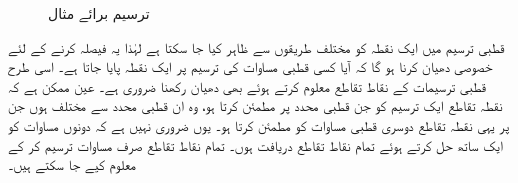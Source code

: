 \begin{figure}
\begin{subfigure}{0.30\textwidth}
\caption{}
\end{subfigure}
\caption{ترسیم برائے مثال }
\label{شکل_مثال_مخروط_کارتیسی_قطبی_ب}
\end{figure}



قطبی ترسیم میں ایک نقطہ کو مختلف طریقوں سے ظاہر کیا جا سکتا ہے لہٰذا یہ فیصلہ کرنے کے لئے خصوصی دھیان کرنا ہو گا کہ آیا کسی قطبی مساوات  کی ترسیم پر ایک  نقطہ پایا جاتا ہے۔ اسی طرح قطبی ترسیمات کے نقاط تقاطع معلوم کرتے ہوئے بھی دھیان رکھنا ضروری ہے۔  عین ممکن ہے کہ نقطہ تقاطع ایک ترسیم کو جن  قطبی محدد پر مطمئن کرتا ہو، وہ ان قطبی محدد سے مختلف ہوں جن پر یہی نقطہ تقاطع دوسری قطبی مساوات کو مطمئن کرتا ہو۔ یوں ضروری نہیں ہے کہ دونوں مساوات کو ایک ساتھ حل کرتے ہوئے تمام نقاط تقاطع دریافت ہوں۔  تمام نقاط تقاطع صرف مساوات  ترسیم کر کے معلوم کیے جا سکتے ہیں۔ 
